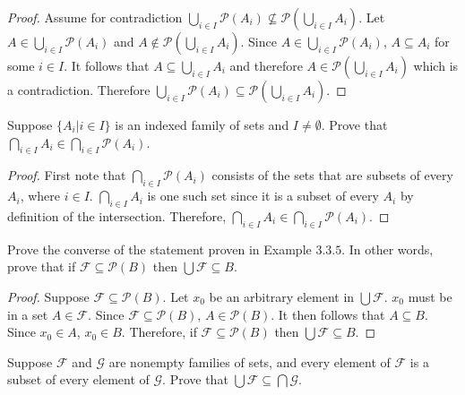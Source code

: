 \begin{proof}
    Assume for contradiction $\bigcup_{i \in I} \mathcal{P}(A_i) \not \subseteq \mathcal{P}(\bigcup_{i \in I} A_i)$.
    Let $A \in \bigcup_{i \in I} \mathcal{P}(A_i)$ and $A \not \in \mathcal{P}(\bigcup_{i \in I} A_i)$.
    Since $A \in \bigcup_{i \in I} \mathcal{P}(A_i)$, $A \subseteq A_i$ for some $i \in I$.
    It follows that $A \subseteq \bigcup_{i \in I} A_i$
    and therefore $A \in \mathcal{P}(\bigcup_{i \in I} A_i)$ which is a contradiction.
    Therefore $\bigcup_{i \in I} \mathcal{P}(A_i) \subseteq \mathcal{P}(\bigcup_{i \in I} A_i)$.
\end{proof}

\begin{tcolorbox}[title=Problem 15, breakable]
    Suppose $\{A_i | i \in  I\}$ is an indexed family of sets and
    $I \not = \emptyset$. Prove that  $\bigcap_{i \in I} A_i \in \bigcap_{i \in I} \mathcal{P}(A_i)$.
\end{tcolorbox}

\begin{proof}
    First note that $\bigcap_{i \in I} \mathcal{P}(A_i)$
    consists of the sets that are subsets of every $A_i$, where $i \in I$.
    $\bigcap_{i \in I} A_i$ is one such set since it is a subset of every $A_i$ by definition of the intersection.
    Therefore, $\bigcap_{i \in I} A_i \in \bigcap_{i \in I} \mathcal{P}(A_i)$.
\end{proof}

\begin{tcolorbox}[title=Problem 16, breakable]
    Prove the converse of the statement proven in
    Example $3.3.5$. In other words, prove that if $\mathcal{F} \subseteq
        \mathcal{P}(B)$ then $\bigcup \mathcal{F} \subseteq B$.
\end{tcolorbox}

\begin{proof}
    Suppose $\mathcal{F} \subseteq \mathcal{P}(B)$.
    Let $x_0$ be an arbitrary element in $\bigcup \mathcal{F}$.
    $x_0$ must be in a set $A \in \mathcal{F}$. 
    Since $\mathcal{F} \subseteq \mathcal{P}(B)$, $A \in \mathcal{P}(B)$.
    It then follows that $A \subseteq B$.
    Since $x_0 \in A$, $x_0 \in B$.
    Therefore, if $\mathcal{F} \subseteq
        \mathcal{P}(B)$ then $\bigcup \mathcal{F} \subseteq B$.
\end{proof}

\begin{tcolorbox}[title=Problem 17, breakable]
    Suppose $\mathcal{F}$ and $\mathcal{G}$ are nonempty families of sets,
    and every element of $\mathcal{F}$ is a subset of every element
    of $\mathcal{G}$. Prove that $\bigcup \mathcal{F} \subseteq  \bigcap \mathcal{G}$.
\end{tcolorbox}

